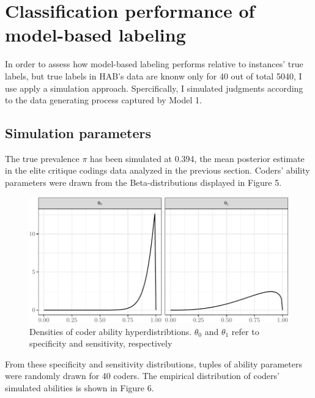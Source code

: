 \documentclass[12pt,]{article}
\begin{document}
\hypertarget{classification-performance-of-model-based-labeling}{%
\section{Classification performance of model-based
labeling}\label{classification-performance-of-model-based-labeling}}

In order to assess how model-based labeling performs relative to
instances' true labels, but true labels in HAB's data are knonw only for
40 out of total 5040, I use apply a simulation approach. Spercifically,
I simulated judgments according to the data generating process captured
by Model 1.

\hypertarget{simulation-parameters}{%
\subsection{Simulation parameters}\label{simulation-parameters}}

The true prevalence \(\pi\) has been simulated at 0.394, the mean
posterior estimate in the elite critique codings data analyzed in the
previous section. Coders' ability parameters were drawn from the
Beta-distributions displayed in Figure 5.

\begin{figure}[H]

{\centering \includegraphics{licht_2019_evaluating_crowdsourced_elite_critique_codings_files/figure-latex/plot_annotator_parameter_PDFs-1} 

}

\caption{Densities of coder ability hyperdistribtions. $\theta_0$ and $\theta_1$ refer to specificity and sensitivity, respectively}\label{fig:plot_annotator_parameter_PDFs}
\end{figure}

From these specificity and sensitivity distributions, tuples of ability
parameters were randomly drawn for 40 coders. The empirical distribution
of coders' simulated abilities is shown in Figure 6.
\end{document}
